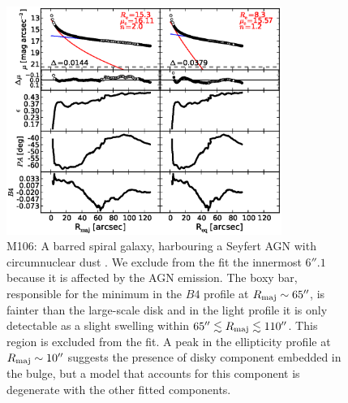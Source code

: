 \documentclass[preprint2]{emulateapj}
\newcommand{\fitfigurewidth}{0.8\textwidth}
\begin{document}
  \begin{figure}[h]
  \begin{center}
  \includegraphics[width=\fitfigurewidth]{m106_1Dfit.eps}
  \caption{M106: 
  A barred spiral galaxy, harbouring a Seyfert AGN \citep{veroncettyveron2006} 
  with circumnuclear dust \citep{martini2003}. 
  We exclude from the fit the innermost $6''.1$ because it is affected by the AGN emission.
  The boxy bar, responsible for the minimum in the $B4$ profile at $R_{\rm maj} \sim 65''$, 
  is fainter than the large-scale disk and in the light profile it is only detectable as a slight swelling
  within $65'' \lesssim R_{\rm maj} \lesssim 110''$.
  This region is excluded from the fit.
  A peak in the ellipticity profile at $R_{\rm maj} \sim 10''$ suggests the presence of disky component embedded in the bulge, 
  but a model that accounts for this component is degenerate with the other fitted components.
  }
  \end{center}
  \end{figure}
\end{document}
